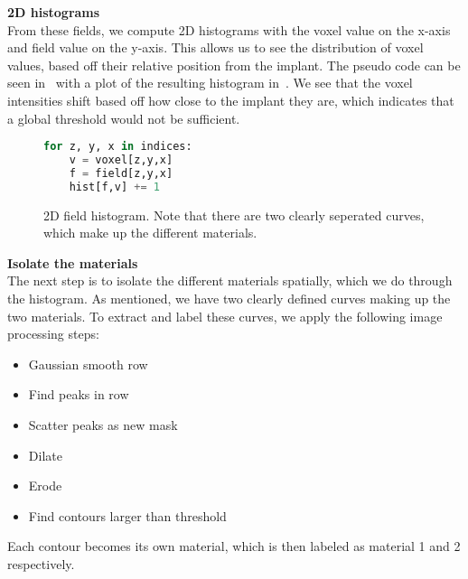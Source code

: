 \vspace{\baselineskip}
\noindent\textbf{2D histograms} \\

From these fields, we compute 2D histograms with the voxel value on the x-axis and field value on the y-axis.
This allows us to see the distribution of voxel values, based off their relative position from the implant.
The pseudo code can be seen in~ with a plot of the resulting histogram in~.
We see that the voxel intensities shift based off how close to the implant they are, which indicates that a global threshold would not be sufficient.

\begin{figure}
    \begin{lstlisting}[language=Python,caption=Python-like pseudo code for computing the 2D field histograms.,label=lis:field-hist]
for z, y, x in indices:
    v = voxel[z,y,x]
    f = field[z,y,x]
    hist[f,v] += 1
    \end{lstlisting}
\end{figure}

\begin{figure}
    \caption{2D field histogram. Note that there are two clearly seperated curves, which make up the different materials.}
    \label{fig:field-hist}
\end{figure}

\vspace{\baselineskip}
\noindent\textbf{Isolate the materials} \\

The next step is to isolate the different materials spatially, which we do through the histogram.
As mentioned, we have two clearly defined curves making up the two materials.
To extract and label these curves, we apply the following image processing steps:
\begin{itemize}
    \item Gaussian smooth row
    \item Find peaks in row
    \item Scatter peaks as new mask
    \item Dilate
    \item Erode
    \item Find contours larger than threshold
\end{itemize}
Each contour becomes its own material, which is then labeled as material 1 and 2 respectively.

